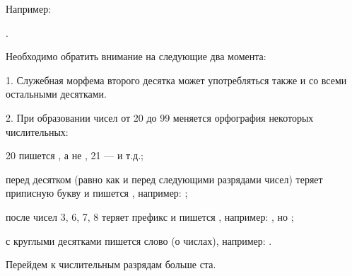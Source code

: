 Например:
\begin{prfsample}
    \item {}.
\end{prfsample}

Необходимо обратить внимание на следующие два момента:

1. Служебная морфема второго десятка может употребляться также и со всеми остальными десятками.

2. При образовании чисел от 20 до 99 меняется орфография некоторых числительных:
\begin{description}
    \item 20 пишется , а не , 21 ---  и т.д.;
    \item {} перед десятком (равно как и перед следующими разрядами чисел) теряет приписную букву и пишется , например: ;
    \item {} после чисел 3, 6, 7, 8 теряет префикс и пишется , например: , но ;
    \item с круглыми десятками пишется слово  (о числах), например: .
\end{description}
		 
Перейдем к числительным разрядам больше ста.

